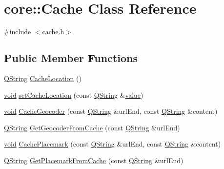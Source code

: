 \hypertarget{classcore_1_1_cache}{\section{core\-:\-:Cache Class Reference}
\label{classcore_1_1_cache}
}


{\ttfamily \#include $<$cache.\-h$>$}

\subsection*{Public Member Functions}
\begin{DoxyCompactItemize}
\item 
\hyperlink{group___u_a_v_objects_plugin_gab9d252f49c333c94a72f97ce3105a32d}{Q\-String} \hyperlink{group___o_p_map_widget_ga3b971bf3f42b18ca30dc670b0a3252fa}{Cache\-Location} ()
\item 
\hyperlink{group___u_a_v_objects_plugin_ga444cf2ff3f0ecbe028adce838d373f5c}{void} \hyperlink{group___o_p_map_widget_ga426941e0eaaa025997f73cd20da01189}{set\-Cache\-Location} (const \hyperlink{group___u_a_v_objects_plugin_gab9d252f49c333c94a72f97ce3105a32d}{Q\-String} \&\hyperlink{glext_8h_aa0e2e9cea7f208d28acda0480144beb0}{value})
\item 
\hyperlink{group___u_a_v_objects_plugin_ga444cf2ff3f0ecbe028adce838d373f5c}{void} \hyperlink{group___o_p_map_widget_ga1c59fdf57a8e404d9069644cc2a06d68}{Cache\-Geocoder} (const \hyperlink{group___u_a_v_objects_plugin_gab9d252f49c333c94a72f97ce3105a32d}{Q\-String} \&url\-End, const \hyperlink{group___u_a_v_objects_plugin_gab9d252f49c333c94a72f97ce3105a32d}{Q\-String} \&content)
\item 
\hyperlink{group___u_a_v_objects_plugin_gab9d252f49c333c94a72f97ce3105a32d}{Q\-String} \hyperlink{group___o_p_map_widget_ga03c3c69129aa5d774e0cfc1b7cc4ace7}{Get\-Geocoder\-From\-Cache} (const \hyperlink{group___u_a_v_objects_plugin_gab9d252f49c333c94a72f97ce3105a32d}{Q\-String} \&url\-End)
\item 
\hyperlink{group___u_a_v_objects_plugin_ga444cf2ff3f0ecbe028adce838d373f5c}{void} \hyperlink{group___o_p_map_widget_ga605683519dbd3609033f61edfdbd6da3}{Cache\-Placemark} (const \hyperlink{group___u_a_v_objects_plugin_gab9d252f49c333c94a72f97ce3105a32d}{Q\-String} \&url\-End, const \hyperlink{group___u_a_v_objects_plugin_gab9d252f49c333c94a72f97ce3105a32d}{Q\-String} \&content)
\item 
\hyperlink{group___u_a_v_objects_plugin_gab9d252f49c333c94a72f97ce3105a32d}{Q\-String} \hyperlink{group___o_p_map_widget_ga6b5384bc829769fac7099d2f62188361}{Get\-Placemark\-From\-Cache} (const \hyperlink{group___u_a_v_objects_plugin_gab9d252f49c333c94a72f97ce3105a32d}{Q\-String} \&url\-End)

\end{DoxyCompactItemize}

